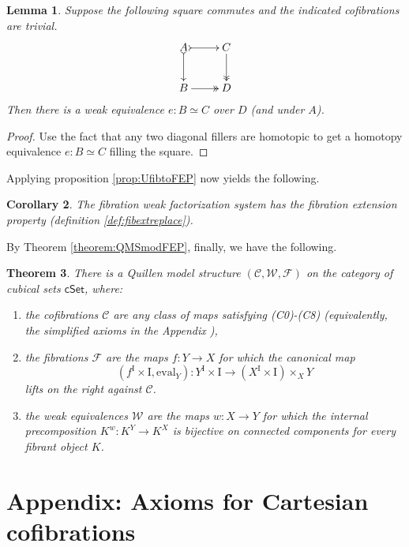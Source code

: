 \documentclass[12pt]{article}
\newcommand{\CC}{\ensuremath{\mathcal{C}}}
\newcommand{\WW}{\ensuremath{\mathcal{W}}}
\newcommand{\FF}{\ensuremath{\mathcal{F}}}
\newcommand{\cSet}{\ensuremath{\mathsf{cSet}}}
\newcommand{\ra}{\ensuremath{\rightarrow}}
\renewcommand{\to}{\ensuremath{\rightarrow}}
\newcommand{\I}{\ensuremath{\mathrm{I}}}
\newtheorem{theorem}{Theorem}
\newtheorem{lemma}[theorem]{Lemma}
\newtheorem{corollary}[theorem]{Corollary}
\theoremstyle{remark}
\theoremstyle{definition}
\begin{document}
\begin{lemma}\label{lem:simple}
Suppose the following square commutes and the indicated cofibrations are trivial.
\begin{equation}\label{diag:standard1}
\xymatrix{
A \ar@{>->}[d] \ar@{>->}[r] & C \ar@{>>}[d] \\
B  \ar@{>>}[r] &  D \\
}
\end{equation}
Then there is a weak equivalence $e : B \simeq C$ over $D$ (and under $A$).
\end{lemma}
\begin{proof}
Use the fact that any two diagonal fillers are homotopic to get a homotopy equivalence $e : B \simeq C$ filling the square.
\end{proof}

Applying proposition \ref{prop:UfibtoFEP} now yields the following.

\begin{corollary}\label{cor:FEP}
The fibration weak factorization system has the fibration extension property (definition \ref{def:fibextreplace}). 
\end{corollary}

By Theorem \ref{theorem:QMSmodFEP}, finally, we have the following.

\begin{theorem}\label{theorem:QMS}
There is a Quillen model structure $(\CC,\WW,\FF)$ on the category of cubical sets $\cSet$, where:
\begin{enumerate}
\item the cofibrations $\CC$ are any class of maps satisfying (C0)-(C8) (equivalently, the simplified axioms in the Appendix%
),
\item the fibrations $\FF$ are the maps $f : Y\ra X$ for which the canonical map 
\[
(f^\I \times \I, \mathrm{eval}_Y) : Y^\I \times \I\ra (X^\I \times \I)\times_X Y
\]
lifts on the right against $\CC$.
\item the weak equivalences $\WW$ are the maps $w : X\ra Y$  for which the internal precomposition $K^w : K^Y \to K^X$ is bijective on connected components for every fibrant object $K$.
\end{enumerate}
\end{theorem}

\section*{Appendix: Axioms for Cartesian cofibrations}\label{appendix:Cofibrations}
\end{document}
